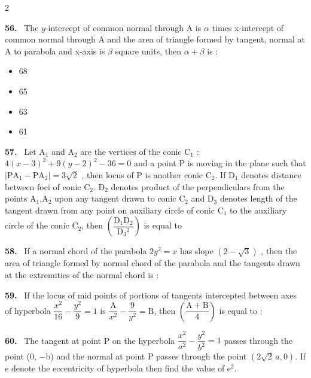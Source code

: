 \documentclass[10pt]{extarticle}
\newcommand{\qn}[1]{\par\smallskip\noindent\textbf{#1.}~}
\newenvironment{qoptions}{\begin{itemize}[leftmargin=1.8em,itemsep=1pt,topsep=2pt,label={}]}{\end{itemize}}
\newcommand{\opt}[2]{\item[(#1)] #2}
\begin{document}
\begin{multicols}{2}
\qn{56} The $y$-intercept of common normal through A is $\alpha$ times x-intercept of common normal through A and the area of triangle formed by tangent, normal at A to parabola and x-axis is $\beta$ square units, then $\alpha+\beta$ is :
\begin{qoptions}
\opt{A}{68}
\opt{B}{65}
\opt{C}{63}
\opt{D}{61}
\end{qoptions}
\qn{57} Let A$_1$ and A$_2$ are the vertices of the conic C$_1$ : $4(x-3)^2+9(y-2)^2-36=0$ and a point P is moving in the plane such that $|\mathrm{PA}_1-\mathrm{PA}_2|=3\sqrt2$ , then locus of P is another conic C$_2$. If D$_1$ denotes distance between foci of conic C$_2$. D$_2$ denotes product of the perpendiculars from the points A$_1$,A$_2$ upon any tangent drawn to conic C$_2$ and D$_3$ denotes length of the tangent drawn from any point on auxiliary circle of conic C$_1$ to the auxiliary circle of the conic C$_2$, then $\left(\dfrac{\mathrm D_1\mathrm D_2}{\mathrm D_3{}^2}\right)$ is equal to
\qn{58} If a normal chord of the parabola $2y^2=x$ has slope $(2-\sqrt3)$ , then the area of triangle formed by normal chord of the parabola and the tangents drawn at the extremities of the normal chord is :
\qn{59} If the locus of mid points of portions of tangents intercepted between axes of hyperbola $\dfrac{x^2}{16}-\dfrac{y^2}{9}=1$ is $\dfrac{\mathrm A}{x^2}-\dfrac9{y^2}=\mathrm B$, then $\left(\dfrac{\mathrm A+\mathrm B}{4}\right)$ is equal to :
\qn{60} The tangent at point P on the hyperbola $\dfrac{x^2}{a^2}-\dfrac{y^2}{b^2}=1$ passes through the point (0, $-$b) and the normal at point P passes through the point $\left(2\sqrt2\,a,0\right)$. If e denote the eccentricity of hyperbola then find the value of e$^2$.
\end{multicols}
\end{document}
